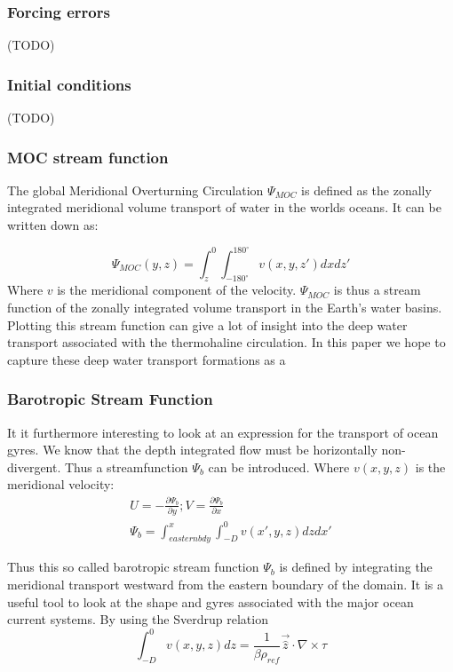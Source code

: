  \subsubsection{Forcing errors}
 (TODO)
 \subsubsection{Initial conditions}
 (TODO)
 
 \subsubsection{MOC stream function} \label{sec:MOCSTREAM}
 
 The global Meridional Overturning Circulation $\Psi_{MOC}$ is defined as the zonally integrated meridional volume transport of water in the worlds oceans. It can be written down as:
 
 $$
 \Psi_{MOC}(y,z) = \int_{z}^{0} \int_{-180^{\circ}}^{180^{\circ}} v(x,y,z') dx dz'
 $$
Where $v$ is the meridional component of the velocity.
$ \Psi_{MOC}$ is thus a stream function of the zonally integrated volume transport in the Earth's water basins. Plotting this stream function can give a lot of insight into the deep water transport associated with the thermohaline circulation. In this paper we hope to capture these deep water transport formations as a 

\subsubsection{Barotropic Stream Function} \label{sec:BSF_theory}
It it furthermore interesting to look at an expression for the transport of ocean gyres. We know that the depth integrated flow must be horizontally non-divergent. Thus a streamfunction $\Psi_{b}$ can be introduced. Where $v(x,y,z)$ is the meridional velocity:
\begin{align}
U = -\frac{\partial \Psi_{b}}{\partial y}; V=\frac{\partial \Psi_{b}}{\partial x} \\
\Psi_{b} = \int_{eastern bdy}^{x} \int_{-D}^{0} v(x',y,z) dz dx'
\end{align}

Thus this so called barotropic stream function $\Psi_{b}$ is defined by integrating the meridional transport westward from the eastern boundary of the domain. It is a useful tool to look at the shape and gyres associated with the major ocean current systems. By using the Sverdrup relation
$$
\int_{-D}^{0}v(x,y,z) dz = \frac{1}{\beta \rho_{ref}}\vec{\hat{z}}\cdot \nabla \times \tau
$$

